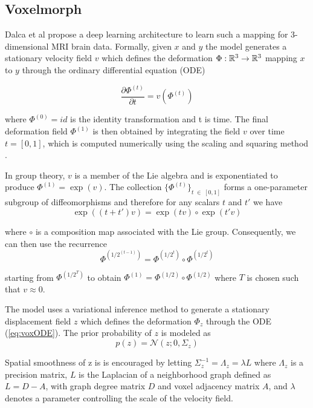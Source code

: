 \subsection{Voxelmorph} \label{sec:vox}
Dalca et al \cite{dalca2018unsupervised} propose a deep learning architecture to learn such a mapping for 3-dimensional MRI brain data. Formally, given $x$ and $y$ the model generates a stationary velocity field $v$ which defines the deformation ${\Phi : \mathbb{R}^3 \rightarrow \mathbb{R}^3}$ mapping $x$ to $y$ through the ordinary differential equation (ODE)

\begin{equation} \label{eq:voxODE}
	\frac{\partial \Phi^{(t)}}{\partial t} = v(\Phi^{(t)})
\end{equation}

where $\Phi^{(0)} = id$ is the identity transformation and t is time.
The final deformation field $\Phi^{(1)}$ is then obtained by integrating the field $v$ over time $t = [0, 1]$, which is computed numerically using the scaling and squaring method \cite{arsigny2006log}.

In group theory, $v$ is a member of the Lie algebra and is exponentiated to produce $\Phi^{(1)} = \exp(v)$.
The collection $\{\Phi^{(t)}\}_{t \; \in \; [0,1]}$ forms a one-parameter subgroup of diffeomorphisms and therefore for any scalars $t$ and $t'$ we have 
\begin{equation} \label{eq:voxoneparamsubgroup}
	\exp((t + t')v) = \exp(tv) \circ \exp(t'v)
\end{equation}

where $\circ$ is a composition map associated with the Lie group. Consequently, we can then use the recurrence
\begin{equation} \label{eq:voxrecurrence}
	\Phi^{(1/2^{(t-1)})} = \Phi^{(1/2^{t})} \circ \Phi^{(1/2^{t})}
\end{equation}

starting from $\Phi^{(1/2^T)}$ to obtain $\Phi^{(1)} = \Phi^{(1/2)} \circ \Phi^{(1/2)}$ where $T$ is chosen such that $v \approx 0$.

The model uses a variational inference method to generate a stationary displacement field $z$ which defines the deformation $\Phi_z$ through the ODE (\ref{eq:voxODE}). The prior probability of $z$ is modeled as
\begin{equation}
	p(z) = \mathcal{N}(z; 0, \Sigma_z)
\end{equation}

Spatial smoothness of z is is encouraged by letting ${\Sigma_z^{-1} = \Lambda_z = \lambda L}$ where $\Lambda_z$ is a precision matrix, $L$ is the Laplacian of a neighborhood graph defined as $L = D - A$, with graph degree matrix $D$ and voxel adjacency matrix $A$, and $\lambda$ denotes a parameter controlling the scale of the velocity field.

